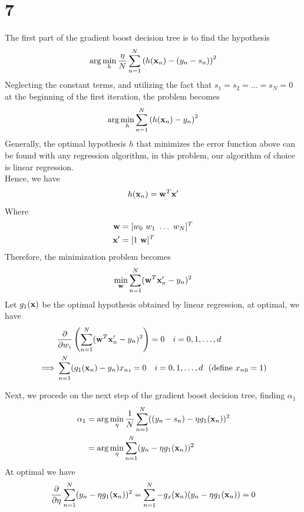 \documentclass[11pt]{article}
\theoremstyle{definition}
\begin{document}
\section*{7}
The first part of the gradient boost decision tree is to find the hypothesis
\[
  \arg\min_h\frac{\eta}{N}\sum^N_{n = 1}\left(h(\vb{x}_n) - (y_n - s_n)\right)^2
\]
Neglecting the constant terms, and utilizing the fact that $s_1 = s_2 =\dots=s_N = 0$ at the beginning of the first iteration, the problem becomes 
\[
  \arg\min_h\sum^N_{n = 1}\left(h(\vb{x}_n) - y_n\right)^2
\]
Generally, the optimal hypothesis $h$ that minimizes the error function above can be found with any regression algorithm, in this problem, our algorithm of choice is linear regression.\\ 
Hence, we have
\[
  h(\vb{x}_n) = \vb{w}^T\vb{x}^\prime
\]
Where
\begin{align*}
  \vb{w} &= [w_0\ w_1\ \dots\ w_N]^T \\ 
  \vb{x}^\prime &= [1\ \vb{w}]^T
\end{align*}
Therefore, the minimization problem becomes
\[
  \min_{\vb{w}}\sum^N_{n = 1}(\vb{w}^T\vb{x}_n^\prime - y_n)^2
\]
Let $g_1(\vb{x})$ be the optimal hypothesis obtained by linear regression, at optimal, we have
\begin{align*}
  & \pdv{}{w_i}\left(\sum^N_{n = 1}(\vb{w}^T\vb{x}_n^\prime - y_n)^2\right) = 0\quad i = 0, 1,\dots,d \\ 
  \implies & \sum^N_{n = 1}(g_1(\vb{x}_n) - y_n){x_n}_i = 0\quad i = 0, 1,\dots,d\ \ (\text{define ${x_n}_0 = 1$})
\end{align*}
\par 
Next, we procede on the next step of the gradient boost decision tree, finding $\alpha_1$
\begin{align*}
  \alpha_1 &= \arg\min_\eta\frac{1}{N}\sum^N_{n = 1}((y_n - s_n) - \eta g_1(\vb{x}_n))^2 \\ 
  &= \arg\min_\eta\sum^N_{n = 1}(y_n - \eta g_1(\vb{x}_n))^2 \\ 
\end{align*}
At optimal we have 
\[
  \pdv{}{\eta}\sum^N_{n = 1}(y_n - \eta g_1(\vb{x}_n))^2 = \sum^N_{n = 1}-g_x(\vb{x}_n)(y_n - \eta g_1(\vb{x}_n)) =  0 
\]
\end{document}
